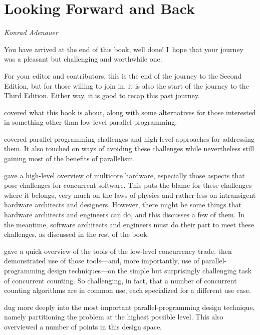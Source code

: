 
\chapter{Looking Forward and Back}
\label{chp:Looking Forward and Back}
%
	  {\emph{Konrad Adenauer}}

You have arrived at the end of this book, well done!
I~hope that your journey was a pleasant but challenging and worthwhile
one.

For your editor and contributors, this is the end of the journey to the
Second Edition, but for those willing to join in, it is also the start
of the journey to the Third Edition.
Either way, it is good to recap this past journey.

 covered what this book is about, along
with some alternatives for those interested in something other than
low-level parallel programming.

 covered parallel-programming challenges and
high-level approaches for addressing them.
It also touched on ways of avoiding these challenges while nevertheless
still gaining most of the benefits of parallelism.

 gave a high-level overview of multicore
hardware, especially those aspects that pose challenges for concurrent
software.
This  puts the blame for these
challenges where it belongs, very much on the laws of physics and rather
less on intransigent hardware architects and designers.
However, there might be some things that hardware architects and engineers
can do, and this  discusses a few of
them.
In the meantime, software architects and engineers must do their part
to meet these challenges, as discussed in the rest of the book.

gave a quick overview of the tools of the low-level concurrency trade.
 then demonstrated use of those tools---and, more
importantly, use of parallel-programming design techniques---on the
simple but surprisingly challenging task of concurrent counting.
So challenging, in fact, that a number of concurrent counting algorithms
are in common use, each specialized for a different use case.

 dug more deeply
into the most important parallel-programming design technique, namely
partitioning the problem at the highest possible level.
This  also
overviewed a number of points in this design space.

